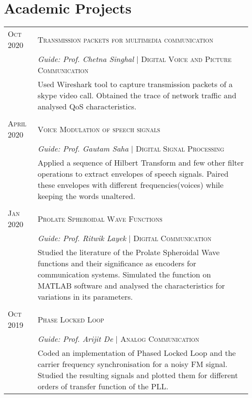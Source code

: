 \documentclass[a4paper,10pt]{article}
\begin{document}
\section{Academic Projects}
\begin{tabular}{p{1.8cm}|p{15.3cm}}
\centering \textsc{Oct 2020} & \textsc{Transmission packets for multimedia communication} 
  \\ &\emph{Guide: Prof. Chetna Singhal} | \footnotesize{\textsc{Digital Voice and Picture Communication}}
  \\&\footnotesize{ Used Wireshark tool to capture transmission packets of a skype video call. Obtained the trace of network traffic and analysed QoS characteristics.}
\\& \\

\centering \textsc{April 2020} & \textsc{Voice Modulation of speech signals} 
  \\ &\emph{Guide: Prof. Gautam Saha} | \footnotesize{\textsc{Digital Signal Processing}}
  \\&\footnotesize{Applied a sequence of Hilbert Transform and few other filter operations to extract envelopes of speech signals.
Paired these envelopes with different frequencies(voices) while keeping the words unaltered. }
\\& \\

\centering \textsc{Jan 2020} & \textsc{Prolate Spheroidal Wave Functions} 
  \\ &\emph{Guide: Prof. Ritwik Layek} | \footnotesize{\textsc{Digital Communication}}
  \\&\footnotesize{Studied the literature of the Prolate Spheroidal Wave functions and their significance as encoders for communication systems. Simulated the function on MATLAB software and analysed the characteristics for variations in its parameters. }\\ & \\

  \centering \textsc{Oct} 2019& \textsc{Phase Locked Loop} 
  \\&\emph{Guide: Prof. Arijit De} | \footnotesize{\textsc{Analog Communication}}
  \\&\footnotesize{ Coded an implementation of Phased Locked Loop and the carrier frequency synchronisation for a noisy FM signal. Studied the resulting signals and plotted them for different orders of transfer function of the PLL.} 
\end{tabular}
\end{document}
